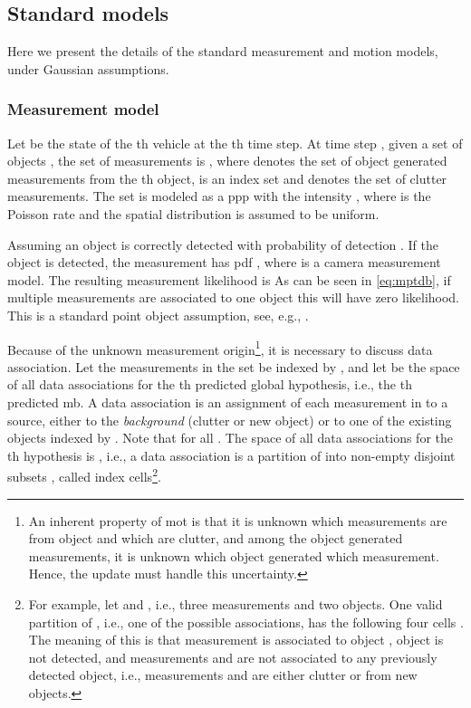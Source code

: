 \documentclass[conference]{IEEEtran}
\begin{document}
\subsection{Standard models}
Here we present the details of the standard measurement and motion models, under Gaussian assumptions.
\subsubsection{Measurement model}
\label{sec:standardMeasModel}
Let  be the state of the th vehicle at the th time step.
At time step , given a set of objects
, the set of measurements is
, where
 denotes the set of object generated measurements from
the th object,  is an index set and  denotes
the set of clutter measurements.
The set  is modeled as a \gls{ppp}
with the intensity , where  is the Poisson rate and the spatial distribution  is assumed to be uniform.

Assuming an object is correctly detected with probability of detection . If the object is detected, the measurement
 has \gls{pdf}
, where  is a camera measurement model.
The resulting measurement likelihood is
\label{eq:mptd}As can be seen in \cref{eq:mptdb}, if multiple measurements are associated to one object this will have zero likelihood. This is a standard point object assumption, see, e.g., \cite{Mahler2007}.

Because of the unknown measurement origin\footnote{An inherent property of \gls{mot} is that it is unknown which measurements are from object and which are clutter, and among the object generated measurements, it is unknown which object generated which measurement. Hence, the update must handle this uncertainty.}, it is necessary to discuss data association. Let the measurements in the set  be indexed by ,
and let  be the space of all data associations  for the th predicted global hypothesis, i.e., the th predicted \gls{mb}. A data association  is an assignment of each measurement in  to a source, either to the \emph{background} (clutter or new object) or to one of the existing objects indexed by . Note that  for all . The space of all data associations for the th hypothesis is , i.e., a data association  is a partition of  into non-empty disjoint subsets , called index cells\footnote{For example, let  and , i.e., three measurements and two objects. One valid partition of , i.e., one of the possible associations, has the following four cells . The meaning of this is that measurement  is associated to object , object  is not detected, and measurements  and  are not associated to any previously detected object, i.e., measurements  and  are either clutter or from new objects.}.
\end{document}
